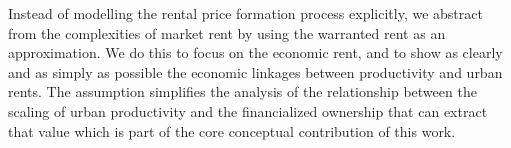 Instead of modelling the rental price formation process explicitly, we abstract from the complexities  of market rent  by using the warranted rent as an approximation. We do this to focus on the economic rent, and to show as clearly and as simply as possible the economic linkages between productivity and urban rents. 
The assumption simplifies the analysis of the relationship between the scaling of urban productivity and the financialized ownership that can extract that value which is part of  the core conceptual contribution of this work. 




 

